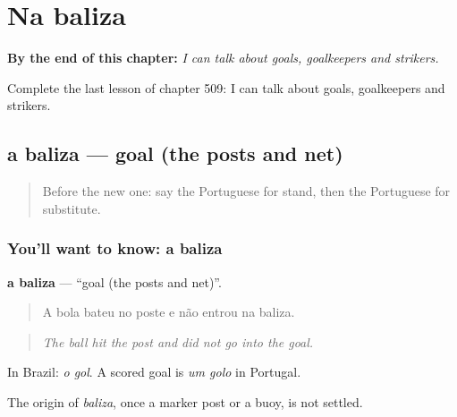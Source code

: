 
\chapter{Na baliza}
\label{ch:pt-na-baliza}

\begin{chapteropening}
\textbf{By the end of this chapter:} \emph{I can talk about goals, goalkeepers and strikers.}

Complete the last lesson of chapter 509: I can talk about goals, goalkeepers and strikers.
\end{chapteropening}

\section[a baliza]{a baliza — goal (the posts and net)}

\label{lesson:PT-C509-baliza}



\begin{quote}
Before the new one: say the Portuguese for stand, then the Portuguese for substitute.
\end{quote}

\subsection*{You'll want to know: a baliza}
\textbf{a baliza} — \textquotedblleft{}goal (the posts and net)\textquotedblright{}.

\begin{quote}
A bola bateu no poste e não entrou na baliza.
\end{quote}

\begin{quote}
\emph{The ball hit the post and did not go into the goal.}
\end{quote}

In Brazil: \emph{o gol}. A scored goal is \emph{um golo} in Portugal.

\begin{cousinweb}
The origin of \emph{baliza}, once a marker post or a buoy, is not settled.
\end{cousinweb}

